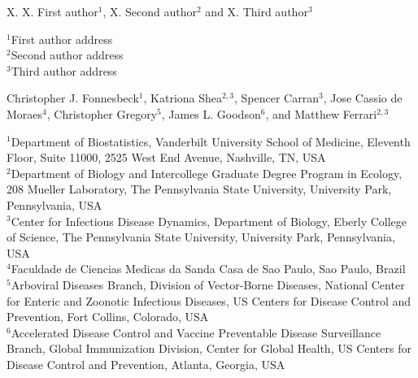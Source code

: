 X. X. First author$^{1}$, X. Second author$^{2}$ and X. Third author$^{3}$

$^{1}$First author address\\
$^{2}$Second author address\\
$^{3}$Third author address

Christopher J. Fonnesbeck$^{1}$, Katriona Shea$^{2,3}$, Spencer Carran$^{3}$, Jose Cassio de Moraes$^{4}$, Christopher Gregory$^{5}$, James L. Goodson$^{6}$, and Matthew Ferrari$^{2,3}$

$^{1}$Department of Biostatistics, Vanderbilt University School of Medicine, Eleventh Floor, Suite 11000, 2525 West End Avenue, Nashville, TN, USA \\
$^{2}$Department of Biology and Intercollege Graduate Degree Program in Ecology, 208 Mueller Laboratory, The Pennsylvania State University, University Park, Pennsylvania, USA \\
$^{3}$Center for Infectious Disease Dynamics, Department of Biology, Eberly College of Science, The Pennsylvania State University, University Park, Pennsylvania, USA \\
$^{4}$Faculdade de Ciencias Medicas da Sanda Casa de Sao Paulo, Sao Paulo, Brazil \\
$^{5}$Arboviral Diseases Branch, Division of Vector-Borne Diseases, National Center for Enteric and Zoonotic Infectious Diseases, US Centers for Disease Control and Prevention, Fort Collins, Colorado, USA \\
$^{6}$Accelerated Disease Control and Vaccine Preventable Disease Surveillance Branch, Global Immunization Division, Center for Global Health, US Centers for Disease Control and Prevention, Atlanta, Georgia, USA \\

